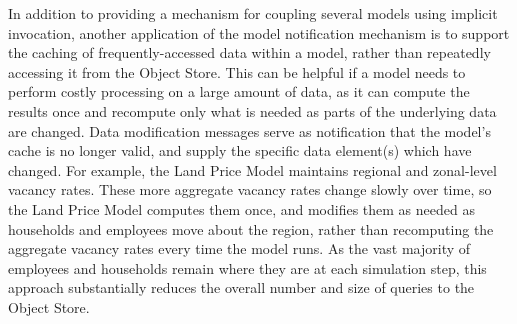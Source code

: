 In addition to providing a mechanism for coupling several models using
implicit invocation, another application of the model notification
mechanism is to support the caching of frequently-accessed data within a
model, rather than repeatedly accessing it from the Object Store.  This can
be helpful if a model needs to perform costly processing on a large amount
of data, as it can compute the results once and recompute only what is
needed as parts of the underlying data are changed.  Data modification
messages serve as notification that the model's cache is no longer valid,
and supply the specific data element(s) which have changed.  For example,
the Land Price Model maintains regional and zonal-level vacancy
rates.  These more aggregate vacancy rates change slowly over time, so the
Land Price Model computes them once, and modifies them as needed as
households and employees move about the region, rather than recomputing the
aggregate vacancy rates every time the model runs.  As the vast majority of
employees and households remain where they are at each simulation step,
this approach substantially reduces the overall number and size of queries
to the Object Store.

